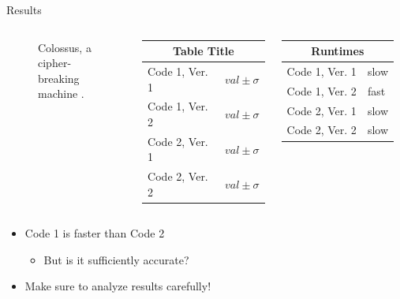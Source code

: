 \documentclass[final]{beamer}
\begin{document}
\begin{frame}{}
\begin{columns}[t]
\begin{column}{.3\linewidth}
\begin{block}{\large Results}
\begin{columns}
\begin{figure}[h!]
	\caption{\footnotesize Colossus, a cipher-breaking machine \cite{wiki:comp}.}
	\end{figure}
	\begin{table}[h]
	\begin{tabular}{ll}
	\multicolumn{2}{c}{Table Title} \\ \hline
	Code 1, Ver. 1 & $val \pm \sigma$ \\
	Code 1, Ver. 2 & $val \pm \sigma$ \\
	Code 2, Ver. 1 & $val \pm \sigma$ \\
	Code 2, Ver. 2 & $val \pm \sigma$
	\end{tabular}
	\end{table}
	\begin{table}[h]
	\begin{tabular}{ll}
	\multicolumn{2}{c}{Runtimes} \\ \hline
	Code 1, Ver. 1 & slow \\
	Code 1, Ver. 2 & fast \\
	Code 2, Ver. 1 & slow \\
	Code 2, Ver. 2 & slow 
	\end{tabular}
	\end{table}
\end{columns}
	\begin{itemize}
	\item Code 1 is faster than Code 2
		\begin{itemize}
		\item But is it sufficiently accurate?
		\end{itemize}
	\item Make sure to analyze results carefully!
	\end{itemize}
		\end{block}
	\vfill
      \end{column}



\end{columns}
\end{frame}
\end{document}
